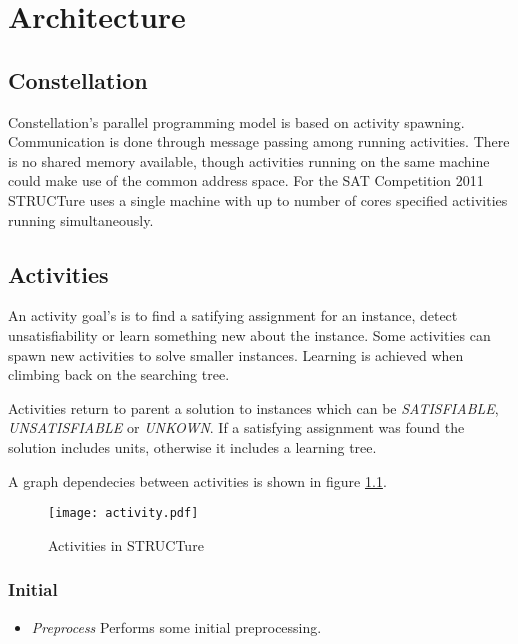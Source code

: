 \chapter{Architecture}

\section{Constellation}

Constellation's parallel programming model is based on activity spawning.
Communication is done through message passing among running activities. There
is no shared memory available, though activities running on the same machine
could make use of the common address space.  For the SAT Competition 2011
STRUCTure uses a single machine with up to number of cores
specified activities running simultaneously.


\section{Activities}

An activity goal's is to find a satifying assignment for an instance,
detect unsatisfiability or learn something new about the instance.
Some activities can spawn new activities to solve smaller instances.
Learning is achieved when climbing back on the searching tree.

Activities return to parent a solution to instances which can be
\emph{SATISFIABLE}, \emph{UNSATISFIABLE} or \emph{UNKOWN}. If
a satisfying assignment was found the solution includes units,
otherwise it includes a learning tree. 

A graph dependecies between activities is shown in figure \ref{fig:activities}.


\begin{figure}
  \centering
  \texttt{[image: activity.pdf]}
  \caption{Activities in STRUCTure}
  \label{fig:activities}
\end{figure}


\subsection{Initial}

\begin{itemize}
  \item \emph{Preprocess} Performs some initial preprocessing.

\end{itemize}


